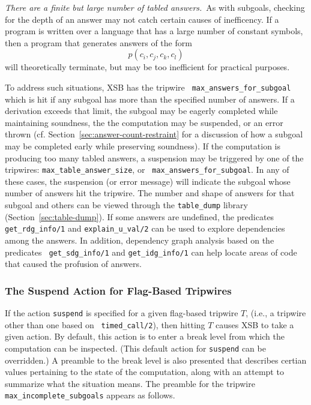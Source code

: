 \item {\em There are a finite but large number of tabled answers.}\ As
  with subgoals, checking for the depth of an answer may not catch
  certain causes of inefficency. If a program is written over a
  language that has a large number of constant symbols, then a program
  that generates answers of the form
\[
   p(c_i,c_j,c_k,c_l)
\]
  will theoretically terminate, but may be too inefficient for
  practical purposes.  

 To address such situations, XSB has the tripwire {\tt
 max\_answers\_for\_subgoal} which is hit if any subgoal has more than
 the specified number of answers.  If a derivation exceeds that limit,
 the subgoal may be eagerly completed while maintaining soundness, the
 the computation may be suspended, or an error thrown
 (cf. Section~\ref{sec:answer-count-restraint} for a discussion of how
 a subgoal may be completed early while preserving soundness).
%
  If the computation is producing too
 many tabled answers, a suspension may be triggered by one of the
 tripwires: {\tt max\_table\_answer\_size}, or {\tt
 max\_answers\_for\_subgoal}.  In any of these cases, the suspension
 (or error message) will indicate the subgoal whose number of answers
 hit the tripwire.  The number and shape of answers for that subgoal
 and others can be viewed through the {\tt table\_dump} library
 (Section~\ref{sec:table-dump}).  If some answers are undefined, the
 predicates {\tt get\_rdg\_info/1} and {\tt explain\_u\_val/2} can be
 used to explore dependencies among the answers.  In addition,
 dependency graph analysis based on the predicates {\tt
 get\_sdg\_info/1} and {\tt get\_idg\_info/1} can help locate areas of
 code that caused the profusion of answers.

 \ei

\subsubsection{The Suspend Action for Flag-Based Tripwires}

If the action {\tt suspend} is specified for a given flag-based
 tripwire $T$, (i.e., a tripwire other than one based on {\tt
 timed\_call/2}), then hitting $T$ causes XSB to take a given action.
  By default, this action is to enter a break level from which the
 computation can be inspected. (This default action for {\tt suspend}
 can be overridden.)  A preamble to the break level is also presented
 that describes certian values pertaining to the state of the
 computation, along with an attempt to summarize what the situation
 means.  The preamble for the tripwire {\tt max\_incomplete\_subgoals}
 appears as follows.

